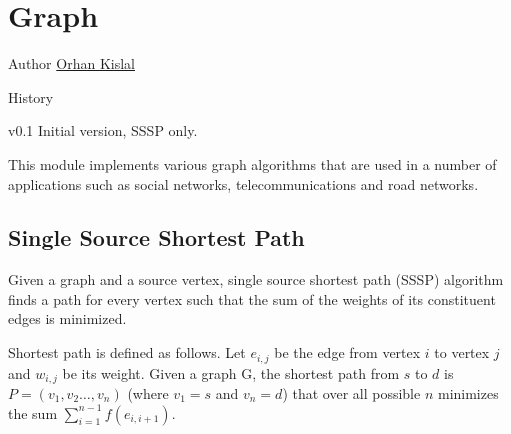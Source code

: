 
\chapter[Graph]{Graph}

\begin{moduleinfo}
\item[Author] \href{mailto:okislal@pivotal.io}{Orhan Kislal}
\item[History]
	\begin{modulehistory}
		\item[v0.1] Initial version, SSSP only.
	\end{modulehistory}
\end{moduleinfo}



This module implements various graph algorithms that are used in a number of applications such as social networks, telecommunications and road networks.



\section{Single Source Shortest Path} \label{sec:graph:sssp}

Given a graph and a source vertex, single source shortest path (SSSP) algorithm finds a path for every vertex such that the sum of the weights of its constituent edges is minimized.

Shortest path is defined as follows. Let $e_{i,j}$ be the edge from vertex $i$ to vertex $j$ and $w_{i,j}$ be its weight. Given a graph G, the shortest path from $s$ to $d$ is $P = (v_1, v_2 \dots, v_n)$ (where $v_1=s$ and $v_n=d$) that over all possible $n$ minimizes the sum $ \sum _{i=1}^{n-1}f(e_{i,i+1})$.


